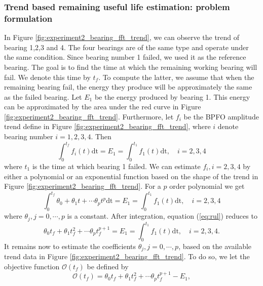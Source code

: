 \documentclass[../Main/thesis.tex]{subfiles}
\begin{document}
\subsubsection{Trend based remaining useful life estimation: problem formulation}
In Figure  \ref{fig:experiment2_bearing_fft_trend}, we can observe the trend of bearing 1,2,3 and 4. The four bearings are of the same type and operate under the same condition. Since bearing number 1 failed, we used it as the reference bearing. The goal is to find the time at which the remaining working bearing will fail. We denote this time by $t_{f}$. To compute the latter, we assume that when the remaining bearing fail, the energy they produce will be approximately the same as the failed bearing. Let $E_{1}$ be the energy produced by bearing 1. This energy can be approximated by the area under the red curve in Figure \ref{fig:experiment2_bearing_fft_trend}. Furthermore, let $f_{i}$ be the BPFO amplitude trend define in Figure  \ref{fig:experiment2_bearing_fft_trend}, where $i$ denote bearing number $i= 1,2,3,4$. Then
\begin{equation}
\int_{0}^{t_{f}} f_{i}(t)\mathrm{dt}=E_{1} = \int_{0}^{t_{1}} f_{1}(t)\mathrm{dt}, \quad i = 2,3,4
\end{equation}
where $t_{1}$ is the time at which bearing 1 failed. We can estimate $f_{i}, i = 2,3,4$ by either a polynomial or an exponential function based on the shape of the trend in Figure \ref{fig:experiment2_bearing_fft_trend}.
For a $p$ order polynomial we get
\begin{equation}\label{eq:rul}
\int_{0}^{t_{f}} \theta_{0}+\theta_{1}t+\cdots \theta_{p}t^{p} \mathrm{dt}=E_{1} = \int_{0}^{t_{1}} f_{1}(t)\mathrm{dt}, \quad i = 2,3,4
\end{equation}
where $\theta_{j}, j = 0,\cdots,p$ is a constant. After integration, equation (\ref{eq:rul}) reduces to 
\begin{equation}\label{eq:rul1}
\theta_{0}t_{f}+\theta_{1}t_{f}^{2}+\cdots \theta_{p}t_{f}^{p+1} =E_{1} = \int_{0}^{t_{1}} f_{1}(t)\mathrm{dt}, \quad i = 2,3,4.
\end{equation}
It remains now to estimate the coefficients $\theta_{j}, j = 0,\cdots,p$, based on the available trend data in Figure \ref{fig:experiment2_bearing_fft_trend}. To do so, we let the objective function $\mathcal{O}(t_{f})$ be defined by 
\begin{equation}
\mathcal{O}(t_{f}) = \theta_{0}t_{f}+\theta_{1}t_{f}^{2}+\cdots \theta_{p}t_{f}^{p+1}-E_{1},
\end{equation}
\end{document}
